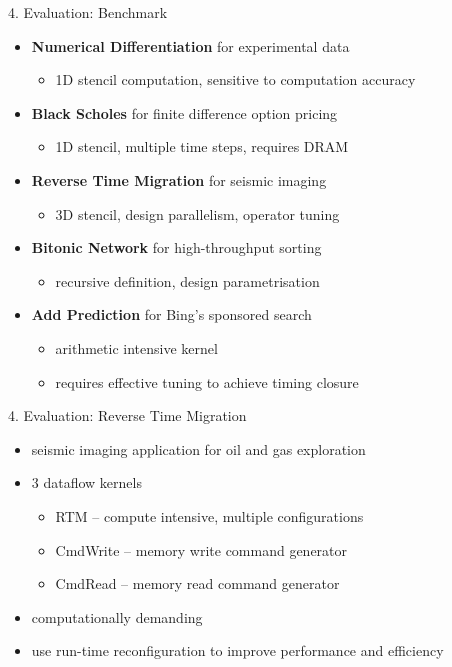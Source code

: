 \begin{frame}{4. Evaluation: Benchmark}

  \begin{itemize}
  \item \textbf{Numerical Differentiation} for experimental data
    \begin{itemize}
    \item 1D stencil computation, sensitive to computation accuracy
    \end{itemize}
  \item \textbf{Black Scholes} for finite difference option pricing
    \begin{itemize}
    \item 1D stencil, multiple time steps, requires DRAM
    \end{itemize}
  \item \textbf{Reverse Time Migration} for seismic imaging
    \begin{itemize}
    \item 3D stencil, design parallelism, operator tuning
    \end{itemize}
  \item \textbf{Bitonic Network} for high-throughput sorting
    \begin{itemize}
    \item recursive definition, design parametrisation
    \end{itemize}
  \item \textbf{Add Prediction} for Bing's sponsored search
    \begin{itemize}
    \item arithmetic intensive kernel
    \item requires effective tuning to achieve timing closure
    \end{itemize}
  \end{itemize}
\end{frame}

\begin{frame}{4. Evaluation: Reverse Time Migration}
  \begin{itemize}
  \item seismic imaging application for oil and gas exploration
  \item 3 dataflow kernels
    \begin{itemize}
    \item RTM -- compute intensive, multiple configurations
    \item CmdWrite -- memory write command generator
    \item CmdRead -- memory read command generator
    \end{itemize}
  \item computationally demanding
  \item use run-time reconfiguration to improve performance and efficiency
  \end{itemize}
\end{frame}


